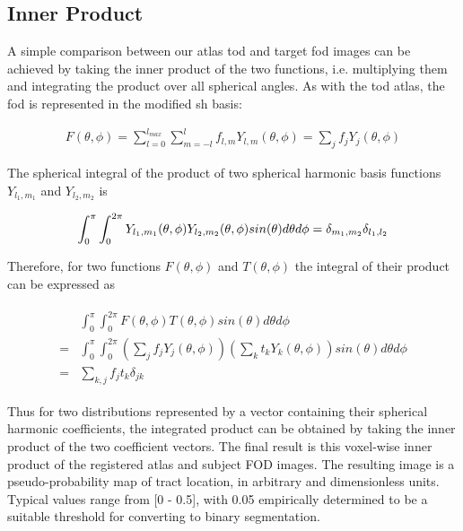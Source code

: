 \subsection{Inner Product}

A simple comparison between our atlas \gls{tod} and target \gls{fod} images can be achieved by taking the inner product of the two functions, i.e. multiplying them and integrating the product over all spherical angles.
As with the \gls{tod} atlas, the \gls{fod} is represented in the modified \gls{sh} basis:

\begin{align}
  F(\theta, \phi) = \sum_{l=0}^{l_{max}} \sum_{m=-l}^l f_{l,m} Y_{l,m}(\theta, \phi) = \sum_j f_jY_j(\theta, \phi)
\end{align}


The spherical integral of the product of two spherical harmonic basis functions $Y_{l_1,m_1}$ and $Y_{l_2,m_2}$ is

\begin{equation}
  \int_0^{\pi} \int_0^{2\pi} Y_{l_1,m_1}(\theta, \phi) Y_{l_2,m_2}(\theta, \phi) sin(\theta) d\theta d\phi \\
    = \delta_{m_1, m_2} \delta_{l_1, l_2}
\end{equation}


Therefore, for two functions  $F(\theta, \phi)$ and $T(\theta, \phi)$ the integral of their product can be expressed as

\begin{align}
  \begin{split}
    & \int_0^{\pi} \int_0^{2\pi} F(\theta, \phi) T(\theta, \phi) sin(\theta) d\theta d\phi \\
    = & \int_0^{\pi} \int_0^{2\pi} (\sum_j f_jY_j(\theta, \phi)) (\sum_k t_kY_k(\theta, \phi)) sin(\theta) d\theta d\phi \\
    = & \sum_{k,j} f_j t_k \delta_{jk}
  \end{split}
\end{align}


Thus for two distributions represented by a vector containing their spherical harmonic coefficients, the integrated product can be obtained by taking the inner product of the two coefficient vectors.
The final result is this voxel-wise inner product of the registered atlas and subject FOD images. The resulting image is a pseudo-probability map of tract location, in arbitrary and dimensionless units. Typical values range from [0 - 0.5], with 0.05 empirically determined to be a suitable threshold for converting to binary segmentation.

